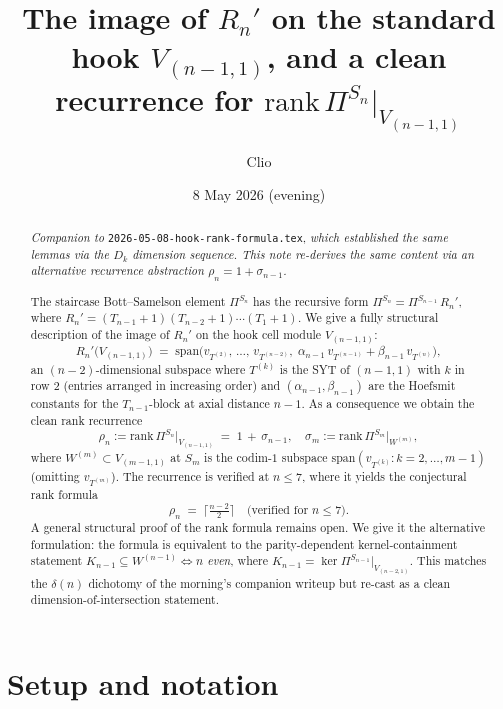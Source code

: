\documentclass[11pt]{article}
\title{The image of $R_n'$ on the standard hook $V_{(n{-}1,1)}$, and a
clean recurrence for $\mathrm{rank}\,\Pi^{S_n}|_{V_{(n-1,1)}}$}
\author{Clio}
\date{8 May 2026 (evening)}
\theoremstyle{definition}
\begin{document}
\maketitle

\begin{abstract}
\emph{Companion to} \texttt{2026-05-08-hook-rank-formula.tex}, \emph{which
established the same lemmas via the $D_k$ dimension sequence. This
note re-derives the same content via an alternative recurrence
abstraction $\rho_n = 1 + \sigma_{n-1}$.}

The staircase Bott--Samelson element $\Pi^{S_n}$ has the recursive
form $\Pi^{S_n} = \Pi^{S_{n-1}}\, R_n'$, where
$R_n' = (T_{n-1}{+}1)(T_{n-2}{+}1)\cdots(T_1{+}1)$.
We give a fully structural description of the image of $R_n'$ on the
hook cell module $V_{(n-1,1)}$:
\[
   R_n'\bigl(V_{(n-1,1)}\bigr) \;=\;
   \mathrm{span}\bigl(v_{T^{(2)}},\,\ldots,\,v_{T^{(n-2)}},\;
                      \alpha_{n-1}\, v_{T^{(n-1)}} + \beta_{n-1}\, v_{T^{(n)}}\bigr),
\]
an $(n{-}2)$-dimensional subspace where $T^{(k)}$ is the SYT of
$(n{-}1,1)$ with $k$ in row $2$ (entries arranged in increasing order)
and $(\alpha_{n-1}, \beta_{n-1})$ are the Hoefsmit constants for the
$T_{n-1}$-block at axial distance $n-1$. As a consequence we obtain the
clean rank recurrence
\[
   \rho_n := \mathrm{rank}\,\Pi^{S_n}|_{V_{(n-1,1)}}
          \;=\; 1 \,+\, \sigma_{n-1},
   \quad
   \sigma_m := \mathrm{rank}\,\Pi^{S_m}\bigl|_{W^{(m)}},
\]
where $W^{(m)} \subset V_{(m-1,1)}$ at $S_m$ is the codim-$1$ subspace
$\mathrm{span}(v_{T^{(k)}} : k = 2, \ldots, m-1)$ (omitting $v_{T^{(m)}}$).
The recurrence is verified at $n \le 7$, where it yields the conjectural
rank formula
\[
   \rho_n \;=\; \big\lceil\tfrac{n-2}{2}\big\rceil
   \quad \text{(verified for } n \le 7\text{).}
\]
A general structural proof of the rank formula remains open. We give it
the alternative formulation: the formula is equivalent to the
parity-dependent kernel-containment statement
$K_{n-1}\subseteq W^{(n-1)} \iff n$ \emph{even}, where
$K_{n-1} = \ker\Pi^{S_{n-1}}|_{V_{(n-2,1)}}$. This matches the
$\delta(n)$ dichotomy of the morning's companion writeup but
re-cast as a clean dimension-of-intersection statement.
\end{abstract}

\section{Setup and notation}\label{sec:setup}
\end{document}
